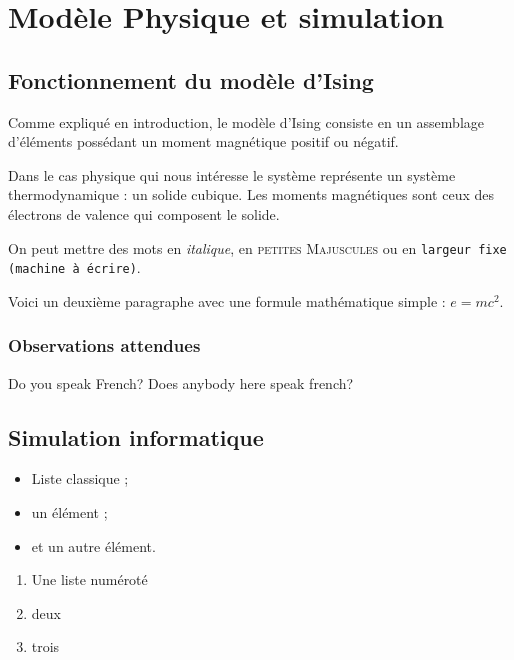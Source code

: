 \section{Modèle Physique et simulation}


\subsection{Fonctionnement du modèle d'Ising}

Comme expliqué en introduction, le modèle d'Ising consiste en un assemblage d'éléments possédant un moment magnétique positif ou négatif.

Dans le cas physique qui nous intéresse le système représente un système thermodynamique : un solide cubique.
Les moments magnétiques sont ceux des électrons de valence qui composent le solide.




On peut mettre des mots en \emph{italique}, 
en \textsc{petites Majuscules} ou 
en \texttt{largeur fixe (machine à écrire)}.

Voici un deuxième paragraphe avec une formule mathématique simple : $e = mc^2$.


\subsubsection{Observations attendues}

\foreignlanguage{english}{Do you speak French? Does anybody here speak french?}


\subsection{Simulation informatique}

\begin{itemize}
\item Liste classique ;
\item un élément ;
\item et un autre élément.
\end{itemize}
\vspace{\parskip} %

\begin{enumerate}
\item Une liste numéroté
\item deux
\item trois
\end{enumerate}
\vspace{\parskip}

